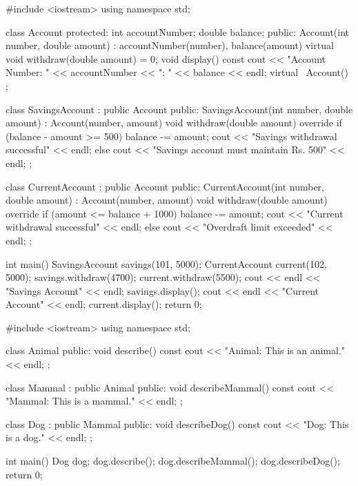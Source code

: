 \begin{code}
#include <iostream>
using namespace std;

class Account {
protected:
    int accountNumber; double balance;
public:
    Account(int number, double amount) : accountNumber(number), balance(amount) {}
    virtual void withdraw(double amount) = 0;
    void display() const {
        cout << "Account Number: " << accountNumber << "\nBalance: " << balance << endl;
    }
    virtual ~Account() {}
};

class SavingsAccount : public Account {
public:
    SavingsAccount(int number, double amount) : Account(number, amount) {}
    void withdraw(double amount) override {
        if (balance - amount >= 500) { balance -= amount; cout << "Savings withdrawal successful" << endl; }
        else cout << "Savings account must maintain Rs. 500" << endl;
    }
};

class CurrentAccount : public Account {
public:
    CurrentAccount(int number, double amount) : Account(number, amount) {}
    void withdraw(double amount) override {
        if (amount <= balance + 1000) { balance -= amount; cout << "Current withdrawal successful" << endl; }
        else cout << "Overdraft limit exceeded" << endl;
    }
};

int main() {
    SavingsAccount savings(101, 5000); CurrentAccount current(102, 5000);
    savings.withdraw(4700); current.withdraw(5500);
    cout << endl << "Savings Account" << endl; savings.display();
    cout << endl << "Current Account" << endl; current.display();
    return 0;
}
\end{code}

\outputlabel
{}


\codelabel

\begin{code}
#include <iostream>
using namespace std;

class Animal {
public:
    void describe() const { cout << "Animal: This is an animal." << endl; }
};

class Mammal : public Animal {
public:
    void describeMammal() const { cout << "Mammal: This is a mammal." << endl; }
};

class Dog : public Mammal {
public:
    void describeDog() const { cout << "Dog: This is a dog." << endl; }
};

int main() {
    Dog dog;
    dog.describe(); dog.describeMammal(); dog.describeDog();
    return 0;
}
\end{code}


